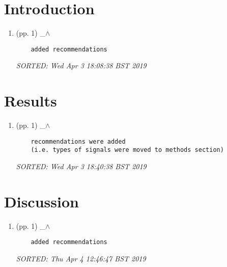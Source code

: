 \documentclass[12pt]{article}
\begin{document}
\section{Introduction}


\begin{enumerate}

\item  (pp. 1)  \_$\wedge$  

	\begin{verbatim}
	added recommendations 	
	\end{verbatim}
	\textit{
	SORTED:  Wed Apr  3 18:08:38 BST 2019
	}
	\\


\end{enumerate}



\section{Results}


\begin{enumerate}

\item  (pp. 1)  \_$\wedge$  

	\begin{verbatim}
	recommendations were added
	(i.e. types of signals were moved to methods section)	
	\end{verbatim}
	\textit{
	SORTED:  Wed Apr  3 18:40:38 BST 2019
	}
	\\


\end{enumerate}





\section{Discussion}


\begin{enumerate}

\item  (pp. 1)  \_$\wedge$  

	\begin{verbatim}
 	added recommendations	
	\end{verbatim}
	\textit{
	SORTED:  Thu Apr  4 12:46:47 BST 2019
	}
	\\


\end{enumerate}
\end{document}
